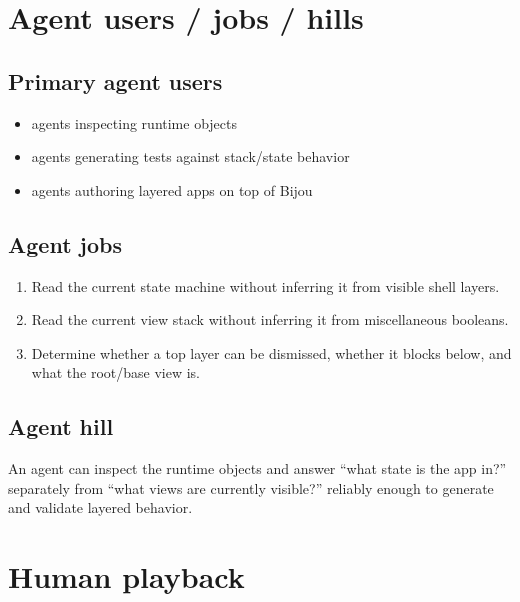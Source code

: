 \section{Agent users / jobs / hills}\label{record-150-agent-users-jobs-hills}

\subsection{Primary agent users}\label{record-150-primary-agent-users}

\begin{itemize}
\tightlist
\item
  agents inspecting runtime objects
\item
  agents generating tests against stack/state behavior
\item
  agents authoring layered apps on top of Bijou
\end{itemize}

\subsection{Agent jobs}\label{record-150-agent-jobs}

\begin{enumerate}
\def\labelenumi{\arabic{enumi}.}
\tightlist
\item
  Read the current state machine without inferring it from visible shell layers.
\item
  Read the current view stack without inferring it from miscellaneous booleans.
\item
  Determine whether a top layer can be dismissed, whether it blocks below, and what the root/base view is.
\end{enumerate}

\subsection{Agent hill}\label{record-150-agent-hill}

An agent can inspect the runtime objects and answer ``what state is the app in?'' separately from ``what views are currently visible?'' reliably enough to generate and validate layered behavior.

\section{Human playback}\label{record-150-human-playback}

